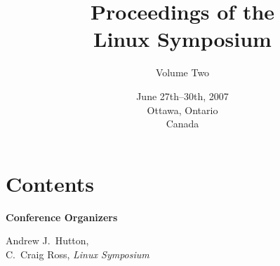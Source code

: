 \documentclass[twoside,12pt]{book}
\begin{document}
\frontmatter


\title{Proceedings of the\\
Linux Symposium}
\author{\vspace{1in}Volume Two\vspace{3in}}
\date{June 27th--30th, 2007\\
 Ottawa, Ontario\\
 Canada}
\maketitle
\thispagestyle{empty}
\cleardoublepage


\section*{Contents}
\begin{raggedright}
\begin{list}{}{%
  \setlength{\rightmargin}{0pt}
  \setlength{\labelwidth}{0pt}
  \setlength{\labelsep}{0pt}
  \setlength{\topsep}{0pt}
  \setlength{\partopsep}{0pt}
  \setlength{\itemsep}{24pt plus6pt minus6pt}
  \setlength{\leftmargin}{2em}
  \setlength{\itemindent}{-\leftmargin}
  \setlength{\listparindent}{0pt}}



\end{list}
\end{raggedright}

\cleardoublepage


\vspace{2cm}

\textbf{{\Large Conference Organizers}}

\vspace{5mm}
\begin{large}
\begin{raggedright}
\hspace*{0.5in}Andrew J.\ Hutton, \\[1ex]
\hspace*{0.5in}C.\ Craig Ross, \hspace*{1ex}\textit{Linux Symposium}
\end{raggedright}
\end{large}
\end{document}
